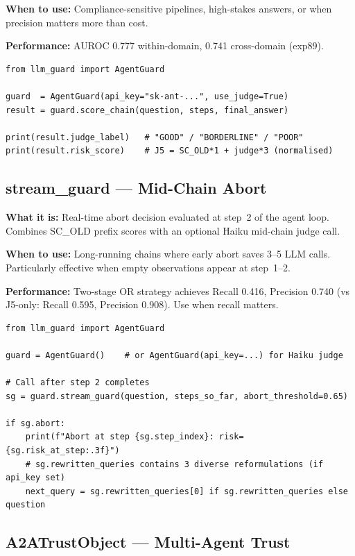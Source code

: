 \documentclass[11pt,a4paper]{article}
\begin{document}
\textbf{When to use:} Compliance-sensitive pipelines, high-stakes answers,
or when precision matters more than cost.

\textbf{Performance:} AUROC 0.777 within-domain, 0.741 cross-domain (exp89).

\begin{lstlisting}
from llm_guard import AgentGuard

guard  = AgentGuard(api_key="sk-ant-...", use_judge=True)
result = guard.score_chain(question, steps, final_answer)

print(result.judge_label)   # "GOOD" / "BORDERLINE" / "POOR"
print(result.risk_score)    # J5 = SC_OLD*1 + judge*3 (normalised)
\end{lstlisting}

\subsection{stream\_guard --- Mid-Chain Abort}

\textbf{What it is:} Real-time abort decision evaluated at step~2 of the
agent loop. Combines SC\_OLD prefix scores with an optional Haiku mid-chain
judge call.

\textbf{When to use:} Long-running chains where early abort saves 3--5 LLM
calls. Particularly effective when empty observations appear at step~1--2.

\textbf{Performance:} Two-stage OR strategy achieves Recall 0.416, Precision
0.740 (vs J5-only: Recall 0.595, Precision 0.908). Use when recall matters.

\begin{lstlisting}
from llm_guard import AgentGuard

guard = AgentGuard()    # or AgentGuard(api_key=...) for Haiku judge

# Call after step 2 completes
sg = guard.stream_guard(question, steps_so_far, abort_threshold=0.65)

if sg.abort:
    print(f"Abort at step {sg.step_index}: risk={sg.risk_at_step:.3f}")
    # sg.rewritten_queries contains 3 diverse reformulations (if api_key set)
    next_query = sg.rewritten_queries[0] if sg.rewritten_queries else question
\end{lstlisting}

\subsection{A2ATrustObject --- Multi-Agent Trust}
\end{document}
